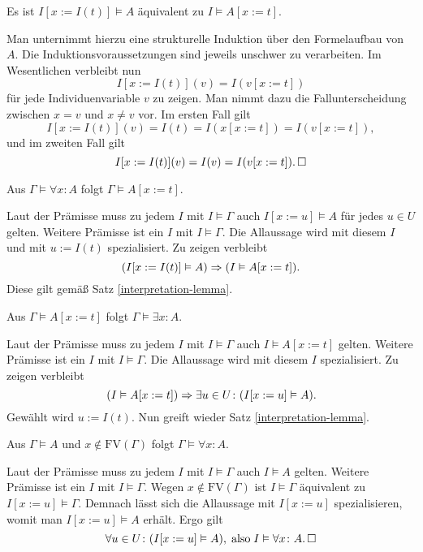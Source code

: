 \begin{Satz}\label{interpretation-lemma}
Es ist $I[x:=I(t)]\models A$ äquivalent zu $I\models A[x:=t]$.
\end{Satz}
\begin{Beweis}
Man unternimmt hierzu eine strukturelle Induktion über den Formelaufbau
von $A$. Die Induktionsvoraussetzungen sind jeweils unschwer zu verarbeiten.
Im Wesentlichen verbleibt nun%
\[I[x:=I(t)](v) = I(v[x:=t])\]
für jede Individuenvariable $v$ zu zeigen. Man nimmt dazu die
Fallunterscheidung zwischen $x=v$ und $x\ne v$ vor. Im ersten Fall gilt%
\[I[x:=I(t)](v) = I(t) = I(x[x:=t]) = I(v[x:=t]),\]
und im zweiten Fall gilt
\[I[x:=I(t)](v) = I(v) = I(v[x:=t]).\,\Box\]
\end{Beweis}

\begin{Satz}
Aus $\Gamma\models\forall x\colon A$ folgt $\Gamma\models A[x:=t]$.
\end{Satz}
\begin{Beweis}
Laut der Prämisse muss zu jedem $I$ mit $I\models\Gamma$
auch $I[x:=u]\models A$ für jedes $u\in U$ gelten. Weitere Prämisse
ist ein $I$ mit $I\models\Gamma$. Die Allaussage wird mit diesem $I$
und mit $u:=I(t)$ spezialisiert. Zu zeigen verbleibt%
\[(I[x:=I(t)]\vDash A)\Rightarrow (I\vDash A[x:=t]).\]
Diese gilt gemäß Satz \ref{interpretation-lemma}.\,\qedsymbol
\end{Beweis}

\begin{Satz}
Aus $\Gamma\models A[x:=t]$ folgt $\Gamma\models\exists x\colon A$.
\end{Satz}
\begin{Beweis}
Laut der Prämisse muss zu jedem $I$ mit $I\models\Gamma$ auch
$I\models A[x:=t]$ gelten. Weitere Prämisse ist ein $I$ mit
$I\models\Gamma$. Die Allaussage wird mit diesem $I$ spezialisiert.
Zu zeigen verbleibt%
\[(I\vDash A[x:=t])\Rightarrow \exists u\in U\colon (I[x:=u]\vDash A).\]
Gewählt wird $u:=I(t)$. Nun greift wieder Satz
\ref{interpretation-lemma}.\,\qedsymbol
\end{Beweis}

\begin{Satz}
Aus $\Gamma\models A$ und $x\notin\mathrm{FV}(\Gamma)$
folgt $\Gamma\models\forall x\colon A$.
\end{Satz}
\begin{Beweis}
Laut der Prämisse muss zu jedem $I$ mit $I\models\Gamma$ auch
$I\models A$ gelten. Weitere Prämisse ist ein $I$ mit
$I\models\Gamma$. Wegen $x\notin\mathrm{FV}(\Gamma)$ ist
$I\models\Gamma$ äquivalent zu $I[x:=u]\models\Gamma$. Demnach
lässt sich die Allaussage mit $I[x:=u]$ spezialisieren, womit
man $I[x:=u]\models A$ erhält. Ergo gilt%
\[\forall u\in U\colon (I[x:=u]\vDash A),\;\text{also}\;
I\vDash\forall x\colon A.\,\Box\]
\end{Beweis}

